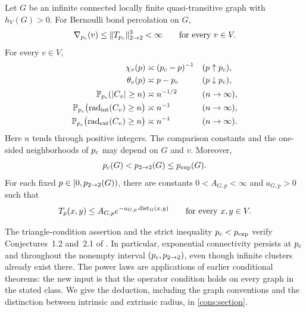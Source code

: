 \begin{corollary}
\label{cor:critical-laws}
Let $G$ be an infinite connected locally finite quasi-transitive graph
with $h_V(G)>0$. For Bernoulli bond percolation on $G$,
\begin{equation}\label{eq:critical-triangle}
 \nabla_{{p_c}}(v)\le\lVert T_{{p_c}}\rVert_{2\to2}^{3}<\infty
 \qquad\text{for every }v\in V.
\end{equation}
For every $v\in V$,
\begin{align}
 \chi_v(p)&\asymp({p_c}-p)^{-1} &&(p\uparrow{p_c}), \label{eq:meanfield-chi}\\
 \theta_v(p)&\asymp p-{p_c} &&(p\downarrow{p_c}), \label{eq:meanfield-theta}\\
 \mathbb P_{{p_c}}(|C_v|\ge n)&\asymp n^{-1/2} &&(n\to\infty), \label{eq:meanfield-size}\\
 \mathbb P_{{p_c}}\bigl(\operatorname{rad}_{\mathrm{int}}(C_v)\ge n\bigr)
    &\asymp n^{-1} &&(n\to\infty), \label{eq:meanfield-intrinsic}\\
 \mathbb P_{{p_c}}\bigl(\operatorname{rad}_{\mathrm{ext}}(C_v)\ge n\bigr)
    &\asymp n^{-1} &&(n\to\infty). \label{eq:meanfield-extrinsic}
\end{align}
Here $n$ tends through positive integers. The comparison constants
and the one-sided neighborhoods of ${p_c}$ may depend on $G$ and $v$.
Moreover,
\begin{equation}\label{eq:exponential-threshold}
 {p_c}(G)<{p_{2\to2}}(G)\le{p_{\exp}}(G).
\end{equation}
For each fixed $p\in[0,{p_{2\to2}}(G))$, there are constants
$0<A_{G,p}<\infty$ and $a_{G,p}>0$ such that
\begin{equation}\label{eq:exponential-connectivity}
 T_p(x,y)\le A_{G,p}e^{-a_{G,p}\operatorname{dist}_G(x,y)}
 \qquad\text{for every }x,y\in V.
\end{equation}
\end{corollary}

The triangle-condition assertion and the strict inequality
${p_c}<{p_{\exp}}$ verify Conjectures~1.2 and~2.1 of
\cite{Hutchcroft2020L2}. In particular, exponential connectivity
persists at ${p_c}$ and throughout the nonempty interval
$({p_c},{p_{2\to2}})$, even though infinite clusters already exist there.
The power laws are applications of earlier conditional theorems:
the new input is that the operator condition holds on every graph in
the stated class. We give the deduction, including the graph
conventions and the distinction between intrinsic and extrinsic
radius, in \cref{cons:section}.


